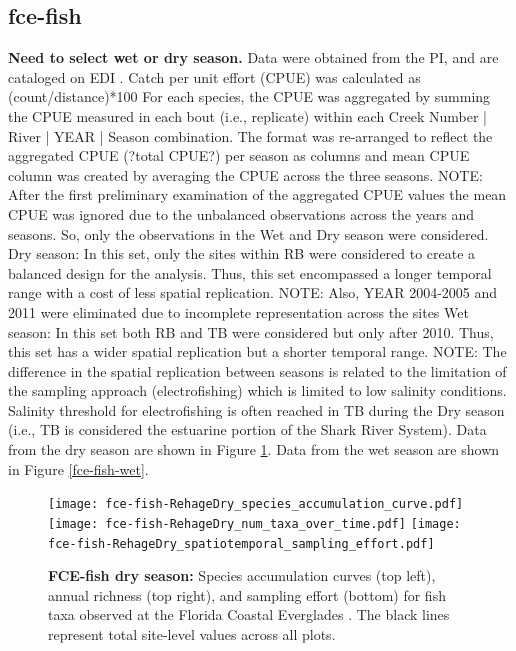 \documentclass[11pt, oneside]{article}
\begin{document}
\subsection {fce-fish}
{\bf Need to select wet or dry season.}
Data were obtained from the PI, and are cataloged on EDI  \citep{fce-fish}.
Catch per unit effort (CPUE) was calculated as (count/distance)*100
For each species, the CPUE was aggregated by summing the CPUE measured in each bout (i.e., replicate) within each Creek Number | River | YEAR | Season combination.
The format was re-arranged to reflect the aggregated CPUE (?total CPUE?) per season as columns and mean CPUE column was created by averaging the CPUE across the three seasons.
NOTE: After the first preliminary examination of the aggregated CPUE values the mean CPUE was ignored due to the unbalanced observations across the years and seasons. 
So, only the observations in the Wet and Dry season were considered.
Dry season: In this set, only the sites within RB were considered to create a balanced design for the analysis. 
Thus, this set encompassed a longer temporal range with a cost of less spatial replication.
NOTE: Also, YEAR 2004-2005 and 2011 were eliminated due to incomplete representation across the sites
Wet season: In this set both RB and TB were considered but only after 2010. Thus, this set has a wider spatial replication but a shorter temporal range.
NOTE: The difference in the spatial replication between seasons is related to the limitation of the sampling approach (electrofishing) which is limited to low salinity conditions. 
Salinity threshold for electrofishing is often reached in TB during the Dry season (i.e., TB is considered the estuarine portion of the Shark River System).
Data from the dry season are shown in Figure \ref{fce-fish-dry}.
Data from the wet season are shown in Figure \ref{fce-fish-wet}.

\begin{figure}[h!]
\centering
\texttt{[image: fce-fish-RehageDry\_species\_accumulation\_curve.pdf]}
\texttt{[image: fce-fish-RehageDry\_num\_taxa\_over\_time.pdf]}
\texttt{[image: fce-fish-RehageDry\_spatiotemporal\_sampling\_effort.pdf]}
\caption{{\bf FCE-fish dry season:} Species accumulation curves (top left),  annual richness (top right), and sampling effort (bottom)  for fish taxa observed at the Florida Coastal Everglades . The black lines represent total site-level values across all plots.}
\label{fce-fish-dry}
\end{figure}
\end{document}
